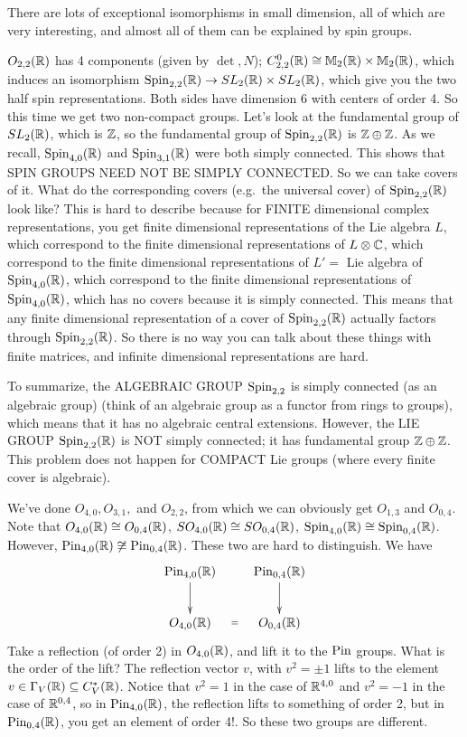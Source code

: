  There are lots of exceptional isomorphisms in small dimension, all of which are very
 interesting, and almost all of them can be explained by spin groups.

 \begin{example}
   $O_{2,2}(\mathbb{R})$ has 4 components (given by $\det, N$); $C^0_{2,2}(\mathbb{R})\cong
   \mathbb{M}_2(\mathbb{R})\times \mathbb{M}_2(\mathbb{R})$, which induces an isomorphism $\operatorname{Spin}_{2,2}(\mathbb{R})\to
   SL_2(\mathbb{R})\times SL_2(\mathbb{R})$, which give you the two half spin representations. Both
   sides have dimension 6 with centers of order 4. So this time we get two non-compact
   groups. Let's look at the fundamental group of $SL_2(\mathbb{R})$, which is $\mathbb{Z}$, so the
   fundamental group of $\operatorname{Spin}_{2,2}(\mathbb{R})$ is $\mathbb{Z}\oplus \mathbb{Z}$. As we recall,
   $\operatorname{Spin}_{4,0}(\mathbb{R})$ and $\operatorname{Spin}_{3,1}(\mathbb{R})$ were both simply connected. This shows
   that SPIN GROUPS NEED NOT BE SIMPLY CONNECTED. So we can take covers of it. What do
   the corresponding covers (e.g.\ the universal cover) of $\operatorname{Spin}_{2,2}(\mathbb{R})$ look
   like? This is hard to describe because for FINITE dimensional complex
   representations, you get finite dimensional representations of the Lie algebra $L$,
   which correspond to the finite dimensional representations of $L\otimes \mathbb{C}$, which
   correspond to the finite dimensional representations of $L'=$ Lie algebra of
   $\operatorname{Spin}_{4,0}(\mathbb{R})$, which correspond to the finite dimensional representations of
   $\operatorname{Spin}_{4,0}(\mathbb{R})$, which has no covers because it is simply connected. This means
   that any finite dimensional representation of a cover of $\operatorname{Spin}_{2,2}(\mathbb{R})$
   actually factors through $\operatorname{Spin}_{2,2}(\mathbb{R})$. So there is no way you can talk about
   these things with finite matrices, and infinite dimensional representations are
   hard.

   To summarize, the ALGEBRAIC GROUP $\operatorname{Spin}_{2,2}$ is simply connected (as an
   algebraic group) (think of an algebraic group as a functor from rings to groups),
   which means that it has no algebraic central extensions. However, the LIE GROUP
   $\operatorname{Spin}_{2,2}(\mathbb{R})$ is NOT simply connected; it has fundamental group $\mathbb{Z}\oplus
   \mathbb{Z}$. This problem does not happen for COMPACT Lie groups (where every finite cover
   is algebraic).
 \end{example}

 We've done $O_{4,0}, O_{3,1},$ and $O_{2,2}$, from which we can obviously get
 $O_{1,3}$ and $O_{0,4}$. Note that $O_{4,0}(\mathbb{R})\cong O_{0,4}(\mathbb{R})$,
 $SO_{4,0}(\mathbb{R})\cong SO_{0,4}(\mathbb{R})$, $\operatorname{Spin}_{4,0}(\mathbb{R})\cong \operatorname{Spin}_{0,4}(\mathbb{R})$.
 However, $\operatorname{Pin}_{4,0}(\mathbb{R})\not\cong \operatorname{Pin}_{0,4}(\mathbb{R})$. These two are hard to
 distinguish. We have
 \[\xymatrix{
    \pin_{4,0}(\RR)\ar[d] & \pin_{0,4}(\RR)\ar[d]\\
    O_{4,0}(\RR) \ar@{}[r]|{=} & O_{0,4}(\RR)
 }\]
 Take a reflection (of order 2) in $O_{4,0}(\mathbb{R})$, and lift it to the $\operatorname{Pin}$ groups.
 What is the order of the lift? The reflection vector $v$, with $v^2=\pm 1$ lifts to
 the element $v\in \Gamma_V(\mathbb{R})\subseteq C^*_V(\mathbb{R})$. Notice that $v^2=1$ in the case of  $\mathbb{R}^{4,0}$
 and $v^2=-1$ in the case of $\mathbb{R}^{0,4}$, so in $\operatorname{Pin}_{4,0}(\mathbb{R})$, the reflection lifts to
 something of order 2, but in $\operatorname{Pin}_{0,4}(\mathbb{R})$, you get an element of order 4!. So
 these two groups are different.

